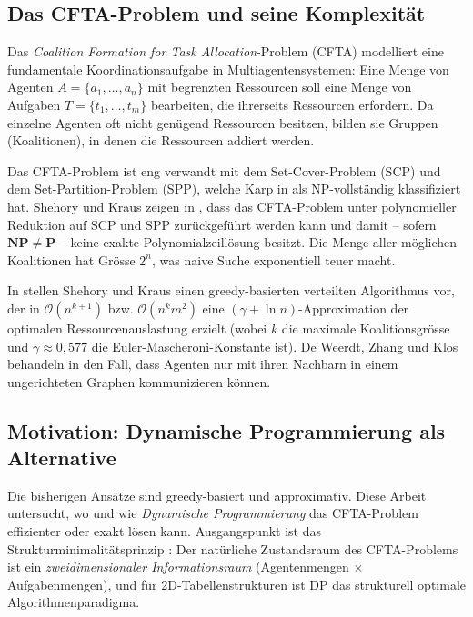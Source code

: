 \documentclass[a4paper,12pt]{article}
\theoremstyle{definition}
\begin{document}
\subsection{Das CFTA-Problem und seine Komplexit\"{a}t}

Das \emph{Coalition Formation for Task Allocation}-Problem (CFTA) modelliert
eine fundamentale Koordinationsaufgabe in Multiagentensystemen: Eine Menge
von Agenten $A = \{a_1, \ldots, a_n\}$ mit begrenzten Ressourcen soll eine
Menge von Aufgaben $T = \{t_1, \ldots, t_m\}$ bearbeiten, die ihrerseits
Ressourcen erfordern. Da einzelne Agenten oft nicht gen\"{u}gend Ressourcen
besitzen, bilden sie Gruppen (Koalitionen), in denen die Ressourcen addiert
werden.

Das CFTA-Problem ist eng verwandt mit dem Set-Cover-Problem (SCP) und dem
Set-Partition-Problem (SPP), welche Karp in \cite{karp72} als NP-vollst\"{a}ndig
klassifiziert hat. Shehory und Kraus zeigen in \cite{sk95}, dass das CFTA-Problem
unter polynomieller Reduktion auf SCP und SPP zur\"{u}ckgef\"{u}hrt werden kann und
damit -- sofern $\mathbf{NP} \neq \mathbf{P}$ -- keine exakte Polynomialzeill\"{o}sung
besitzt. Die Menge aller m\"{o}glichen Koalitionen hat Gr\"{o}sse $2^n$, was naive
Suche exponentiell teuer macht.

In \cite{sk98} stellen Shehory und Kraus einen greedy-basierten verteilten
Algorithmus vor, der in $\mathcal{O}(n^{k+1})$ bzw. $\mathcal{O}(n^k m^2)$
eine $(\gamma + \ln n)$-Approximation der optimalen Ressourcenauslastung
erzielt (wobei $k$ die maximale Koalitionsgr\"{o}sse und $\gamma \approx 0{,}577$
die Euler-Mascheroni-Konstante ist). De Weerdt, Zhang und Klos behandeln in
\cite{dwzk07} den Fall, dass Agenten nur mit ihren Nachbarn in einem
ungerichteten Graphen kommunizieren k\"{o}nnen.

\subsection{Motivation: Dynamische Programmierung als Alternative}

Die bisherigen Ans\"{a}tze sind greedy-basiert und approximativ. Diese Arbeit
untersucht, wo und wie \emph{Dynamische Programmierung} das CFTA-Problem
effizienter oder exakt l\"{o}sen kann. Ausgangspunkt ist das
Strukturminimalit\"{a}tsprinzip \cite{epp2026struktur}: Der nat\"{u}rliche
Zustandsraum des CFTA-Problems ist ein \emph{zweidimensionaler Informationsraum}
(Agentenmengen $\times$ Aufgabenmengen), und f\"{u}r 2D-Tabellenstrukturen ist
DP das strukturell optimale Algorithmenparadigma.
\end{document}
